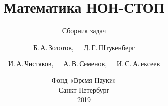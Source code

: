 \subject{\large\textrm{\ } %
	\vspace{0.8in}}

\title{\fontsize{25}{25}\selectfont
	Математика НОН-СТОП}
\subtitle{\fontsize{18}{18}\selectfont
	Сборник задач
	\vspace{1.05in}}

\author{Б.\,А.\,Золотов,\ \ \ Д.\,Г.\,Штукенберг \\
	\and И.\,А.\,Чистяков,\ \ \ А.\,В.\,Семенов,\ \ \ И.\,С.\,Алексеев
	\vspace{1.25in}}

\date{\normalsize Фонд «Время Науки» \\ Санкт-Петербург \\ 2019}
